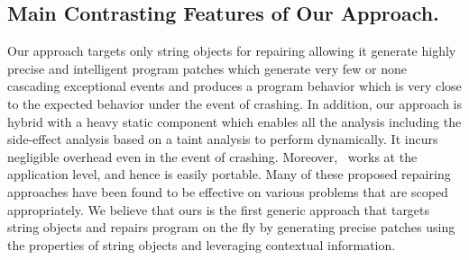 \subsection{Main Contrasting Features of Our Approach.}
Our approach targets only string objects for repairing allowing it
generate highly precise and intelligent program patches which generate very few or none
cascading exceptional events and produces a program behavior which is very close
to the expected behavior under the event of crashing.
In addition, our approach is hybrid with a heavy static component which enables
all the analysis including the side-effect analysis based on a taint analysis to
perform dynamically. It incurs negligible overhead even in the event of
crashing. Moreover, \tool\ works at the application level, and hence is easily portable.
Many of these proposed repairing approaches have been found to be effective on
various problems that are scoped appropriately. We believe that ours is the first
generic approach that targets string objects and repairs program on the fly by
generating precise patches using the properties of string objects and leveraging contextual
information.



















